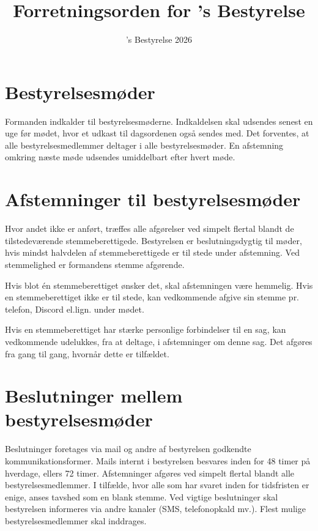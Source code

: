 

\title{Forretningsorden for \fredagscafeen's Bestyrelse}
\author{\fredagscafeen's Bestyrelse 2026}
\date{}

\renewcommand{\thesection}{§\arabic{section}}



\maketitle

\section{Bestyrelsesmøder}
Formanden indkalder til bestyrelsesmøderne. Indkaldelsen skal udsendes senest en uge før mødet, 
hvor et udkast til dagsordenen også sendes med. Det forventes, at alle bestyrelsesmedlemmer deltager i alle bestyrelsesmøder. 
En afstemning omkring næste møde udsendes umiddelbart efter hvert møde.

\section{Afstemninger til bestyrelsesmøder}
Hvor andet ikke er anført, træffes alle afgørelser ved simpelt flertal blandt de tilstedeværende 
stemmeberettigede. Bestyrelsen er beslutningsdygtig til møder, hvis mindst halvdelen af 
stemmeberettigede er til stede under afstemning. Ved stemmelighed er formandens stemme afgørende.

Hvis blot én stemmeberettiget ønsker det, skal afstemningen være hemmelig. Hvis en stemmeberettiget 
ikke er til stede, kan vedkommende afgive sin stemme pr. telefon, Discord el.lign. under mødet.

Hvis en stemmeberettiget har stærke personlige forbindelser til en sag, kan vedkommende udelukkes, 
fra at deltage, i afstemninger om denne sag. Det afgøres fra gang til gang, hvornår dette er tilfældet.

\section{Beslutninger mellem bestyrelsesmøder}
Beslutninger foretages via mail og andre af bestyrelsen godkendte kommunikationsformer. Mails internt 
i bestyrelsen besvares inden for 48 timer på hverdage, ellers 72 timer. Afstemninger afgøres ved simpelt 
flertal blandt alle bestyrelsesmedlemmer. I tilfælde, hvor alle som har svaret inden for tidsfristen er 
enige, anses tavshed som en blank stemme. Ved vigtige beslutninger skal bestyrelsen informeres via andre 
kanaler (SMS, telefonopkald mv.). Flest mulige bestyrelsesmedlemmer skal inddrages.

